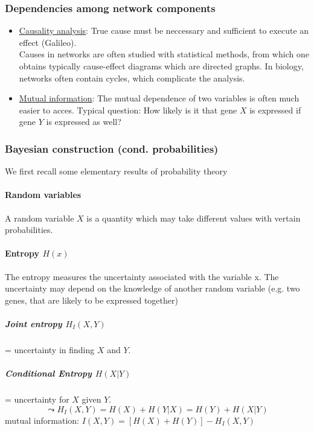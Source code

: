 \subsubsection{Dependencies among network components}
\begin{itemize}[label={$-$}]
\item \underline{Causality analysis}: True cause must be neccessary and sufficient to execute an effect (Galileo).\\
Causes in networks are often studied with statistical methods, from which one obtains typically cause-effect diagrams which are directed graphs. In biology, networks often contain cycles, which complicate the analysis.
\item \underline{Mutual information}: The mutual dependence of two variables is often much easier to acces. Typical question: How likely is it that gene $X$ is expressed if gene $Y$ is expressed as well?
\end{itemize}
\subsubsection{Bayesian construction (cond. probabilities)}
We first recall some elementary results of probability theory
\paragraph{Random variables} A random variable $X$ is a quantity which may take different values with vertain probabilities.
\paragraph{Entropy $H(x)$} The entropy measures the uncertainty associated with the variable x. The uncertainty may depend on the knowledge of another random variable (e.g. two genes, that are likely to be expressed together)
\subparagraph{Joint entropy $H_I(X,Y)$} = uncertainty in finding $X$ and $Y$.
\subparagraph{Conditional Entropy $H(X|Y)$} = uncertainty for $X$ given $Y$.
\begin{equation*}
\leadsto H_I(X,Y)=H(X)+H(Y|X)=H(Y)+H(X|Y)
\end{equation*}
mutual information: $I(X,Y)=\left[H(X)+H(Y)\right]-H_I(X,Y)$
